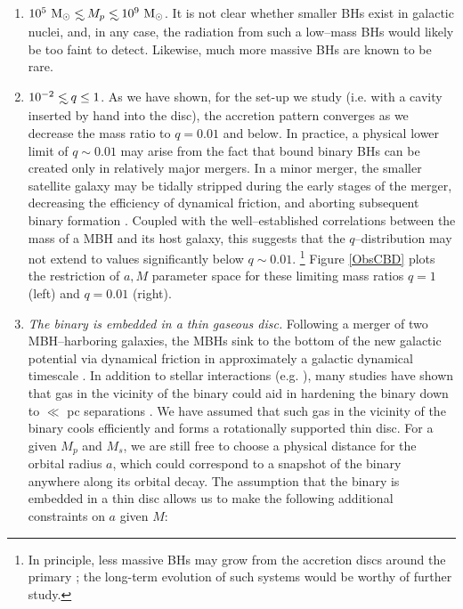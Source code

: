 \begin{enumerate}
	\item{$10^5~{\rm M_\odot} \lsim M_p \lsim 10^9~{\rm M_\odot}$. It is not clear whether smaller BHs exist in galactic nuclei, and, in any case,
	the radiation from such a low--mass BHs would likely be too faint to
	detect.  Likewise, much more massive BHs are known to be rare.} 
%
	\item{$10^{-2}\lsim q \leq 1$. As we have shown, for the set-up we study (i.e. with a cavity inserted
	by hand into the disc), the accretion pattern converges as we decrease
	the mass ratio to $q=0.01$ and below. In practice, a physical lower limit of $q\sim
	0.01$ may arise from the fact that bound binary BHs can be
	created only in relatively major mergers. 
	In a minor merger, the smaller satellite galaxy may be tidally stripped
	during the early stages of the merger, decreasing the efficiency of dynamical friction, 
	and aborting subsequent binary formation \citep{Callegari+:2009}.
 	Coupled with the well--established correlations
	between the mass of a MBH and its host galaxy, this suggests that the
	$q$--distribution may not extend to values significantly below $q\sim
	0.01$.  \footnote{In principle, less massive BHs may grow from the
 	 accretion discs around the primary \citep{McKernan+2012}; the
	  long-term evolution of such systems would be worthy of further  study.}
	 Figure \ref{ObsCBD} plots the restriction of $a, M$ parameter space for 
	 these limiting mass ratios $q=1$ (left) and $q=0.01$ (right).}
%
	\item{\textit{The binary is embedded in a thin gaseous disc.} Following a merger of two MBH--harboring galaxies, the MBHs sink to
	the bottom of the new galactic potential via dynamical friction in
	approximately a galactic dynamical timescale
	\citep{Begel:Blan:Rees:1980}. In addition to stellar interactions
	(e.g. \citealt{Preto:2011}), many studies have shown that gas in the
	vicinity of the binary could aid in hardening the binary down to $\ll$
	pc separations \citep[\textit{e.g.}][]
	{Escala:2005,Dotti:2007,Mayer+2007,Lodato:2009,Cuadra:2009,Nixon:2011:LongSim,Chapon+2011}.
	We have assumed that such gas in the vicinity of the binary cools
	efficiently and forms a rotationally supported thin disc.  For a given
	$M_p$ and $M_s$, we are still free to choose a physical distance for
	the orbital radius $a$, which could correspond to a snapshot of the
	binary anywhere along its orbital decay.  The assumption that the binary is embedded in a thin disc allows us to make the following additional constraints on $a$ given $M$:
}
\end{enumerate}

